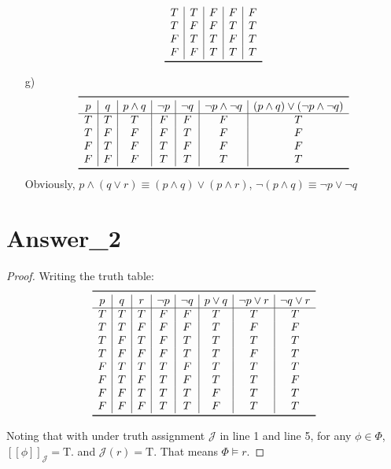 \documentclass{article}
\begin{document}
\begin{itemize}
\[\begin{array}{c|c|c|c|c}
                T & T & F & F & F \\
                T & F & F & T & T \\
                F & T & T & F & T \\
                F & F & T & T & T \\
                \bottomrule
            \end{array}
        \]
    \item[g)]
        \[
            \begin{array}{c|c|c|c|c|c|c}
                \toprule
                p & q & p \land q & \neg p & \neg q & \neg p \land \neg q & (p \land q) \lor (\neg p \land \neg q) \\
                \hline
                T & T & T & F & F & F & T \\
                T & F & F & F & T & F & F \\
                F & T & F & T & F & F & F \\
                F & F & F & T & T & T & T \\
                \bottomrule
            \end{array}
        \]
    Obviously, $p \land (q \lor r) \equiv (p \land q) \lor (p \land r)$, $\lnot(p \land q) \equiv \lnot p \lor \lnot q$
\end{itemize}

\section{Answer\_2}

\begin{proof}
    Writing the truth table:
    \[
        \begin{array}{c|c|c|c|c|c|c|c}
            \toprule
            p & q & r & \lnot p & \lnot q & p \lor q & \lnot p \lor r & \lnot q \lor r \\
            \hline
            T & T & T & F & F & T & T & T \\
            T & T & F & F & F & T & F & F \\
            T & F & T & F & T & T & T & T \\
            T & F & F & F & T & T & F & T \\
            F & T & T & T & F & T & T & T \\
            F & T & F & T & F & T & T & F \\
            F & F & T & T & T & F & T & T \\
            F & F & F & T & T & F & T & T \\
            \bottomrule
        \end{array}    
    \]

    Noting that with under truth assignment $\mathcal{J}$ in line 1 and line 5, for any $\phi \in \Phi $, $[\![\phi]\!]_\mathcal{J} = \text{T}$.
    and $\mathcal{J}(r) = \text{T}$. That means $\Phi \models r$.
    \qedhere
\end{proof}
\end{document}
